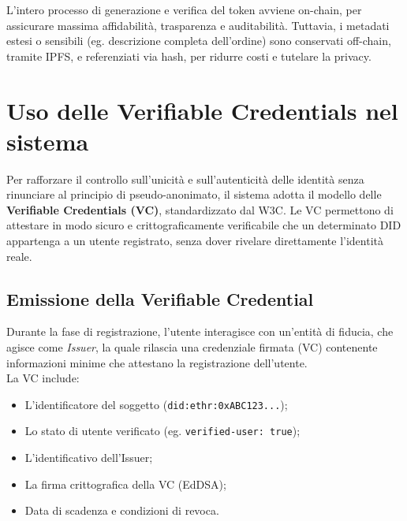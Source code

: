             \noindent L'intero processo di generazione e verifica del token avviene on-chain, per assicurare massima affidabilità, trasparenza e auditabilità. Tuttavia, i metadati estesi o sensibili (eg. descrizione completa dell'ordine) sono conservati off-chain, tramite IPFS, e referenziati via hash, per ridurre costi e tutelare la privacy.

    \section{Uso delle Verifiable Credentials nel sistema}
        Per rafforzare il controllo sull'unicità e sull'autenticità delle identità senza rinunciare al principio di pseudo-anonimato, il sistema adotta il modello delle \textbf{Verifiable Credentials (VC)}, standardizzato dal W3C. Le VC permettono di attestare in modo sicuro e crittograficamente verificabile che un determinato DID appartenga a un utente registrato, senza dover rivelare direttamente l'identità reale.

        \subsection{Emissione della Verifiable Credential}
            Durante la fase di registrazione, l'utente interagisce con un'entità di fiducia, che agisce come \textit{Issuer}, la quale rilascia una credenziale firmata (VC) contenente informazioni minime che attestano la registrazione dell'utente. \\
            La VC include:
                \begin{itemize}
                    \item L'identificatore del soggetto (\texttt{did:ethr:0xABC123...});
                    
                    \item Lo stato di utente verificato (eg. \texttt{verified-user: true});
                    
                    \item L'identificativo dell'Issuer;
                    
                    \item La firma crittografica della VC (EdDSA);
                    
                    \item Data di scadenza e condizioni di revoca.
                \end{itemize}
        
